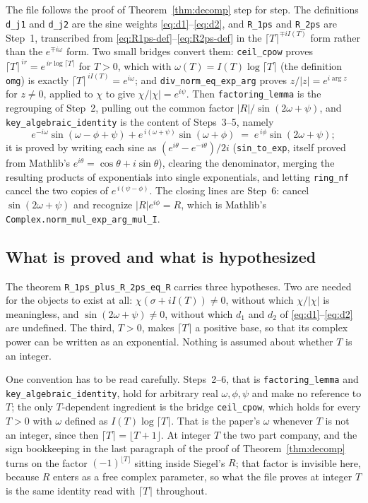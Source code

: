 \documentclass[11pt]{article}
\theoremstyle{definition}
\begin{document}
The file follows the proof of Theorem~\ref{thm:decomp} step for step. The
definitions \texttt{d\_j1} and \texttt{d\_j2} are the sine weights
\eqref{eq:d1}--\eqref{eq:d2}, and \texttt{R\_1ps} and \texttt{R\_2ps} are Step~1,
transcribed from \eqref{eq:R1ps-def}--\eqref{eq:R2ps-def} in the
$\lceil T\rceil^{\mp iI(T)}$ form rather than the $e^{\mp i\omega}$ form.
Two small bridges convert them: \texttt{ceil\_cpow} proves
$\lceil T\rceil^{\,ir}=e^{\,ir\log\lceil T\rceil}$ for $T>0$, which with
$\omega(T)=I(T)\log\lceil T\rceil$ (the definition \texttt{omg}) is exactly
$\lceil T\rceil^{\,iI(T)}=e^{i\omega}$; and
\texttt{div\_norm\_eq\_exp\_arg} proves $z/|z|=e^{i\arg z}$ for $z\neq0$, applied
to $\chi$ to give $\chi/|\chi|=e^{i\psi}$. Then
\texttt{factoring\_lemma} is the regrouping of Step~2, pulling out the common
factor $|R|/\sin(2\omega+\psi)$, and
\texttt{key\_algebraic\_identity} is the content of Steps~3--5, namely
\begin{equation}\label{eq:lean-key}
e^{-i\omega}\sin(\omega-\phi+\psi)+e^{\,i(\omega+\psi)}\sin(\omega+\phi)
\;=\;
e^{\,i\phi}\sin(2\omega+\psi);
\end{equation}
it is proved by writing each sine as
$(e^{i\theta}-e^{-i\theta})/2i$ (\texttt{sin\_to\_exp}, itself proved from
Mathlib's $e^{i\theta}=\cos\theta+i\sin\theta$), clearing the denominator,
merging the resulting products of exponentials into single exponentials, and
letting \texttt{ring\_nf} cancel the two copies of $e^{\,i(\psi-\phi)}$. The
closing lines are Step~6: cancel $\sin(2\omega+\psi)$ and recognize
$|R|e^{i\phi}=R$, which is Mathlib's
\texttt{Complex.norm\_mul\_exp\_arg\_mul\_I}.

\subsection{What is proved and what is hypothesized}

The theorem \texttt{R\_1ps\_plus\_R\_2ps\_eq\_R} carries three hypotheses. Two are
needed for the objects to exist at all: $\chi(\sigma+iI(T))\neq0$, without which
$\chi/|\chi|$ is meaningless, and $\sin(2\omega+\psi)\neq0$, without which $d_1$
and $d_2$ of \eqref{eq:d1}--\eqref{eq:d2} are undefined. The third, $T>0$, makes
$\lceil T\rceil$ a positive base, so that its complex power can be written as an
exponential. Nothing is assumed about whether $T$ is an integer.

One convention has to be read carefully. Steps~2--6, that is
\texttt{factoring\_lemma} and \texttt{key\_algebraic\_identity}, hold for
arbitrary real $\omega,\phi,\psi$ and make no reference to $T$; the only
$T$-dependent ingredient is the bridge \texttt{ceil\_cpow}, which holds for every
$T>0$ with $\omega$ defined as $I(T)\log\lceil T\rceil$. That is the paper's
$\omega$ whenever $T$ is not an integer, since then
$\lceil T\rceil=\lfloor T+1\rfloor$. At integer $T$ the two part company, and the
sign bookkeeping in the last paragraph of the proof of
Theorem~\ref{thm:decomp} turns on the factor $(-1)^{\lfloor T\rfloor}$ sitting
inside Siegel's $R$; that factor is invisible here, because $R$ enters as a free
complex parameter, so what the file proves at integer $T$ is the same identity
read with $\lceil T\rceil$ throughout.
\end{document}

